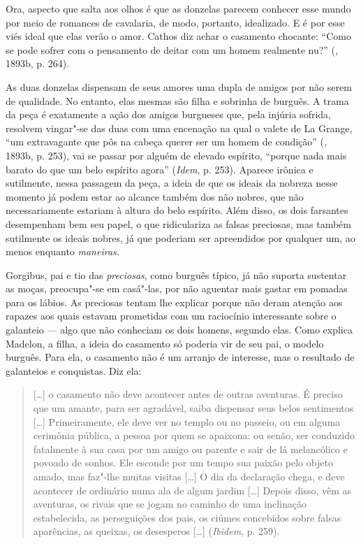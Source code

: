 Ora, aspecto que salta aos olhos é que as donzelas parecem conhecer esse
mundo por meio de romances de cavalaria, de modo, portanto, idealizado.
E é por esse viés ideal que elas verão o amor. Cathos diz achar o
casamento chocante: ``Como se pode sofrer com o pensamento de deitar com
um homem realmente nu?'' (, 1893b, p. 264).

As duas donzelas dispensam de seus amores uma dupla de amigos por não
serem de qualidade. No entanto, elas mesmas são filha e sobrinha de
burguês. A trama da peça é exatamente a ação dos amigos burgueses que,
pela injúria sofrida, resolvem vingar"-se das duas com uma encenação na
qual o valete de La Grange, ``um extravagante que pôs na cabeça querer
ser um homem de condição'' (, 1893b, p. 253), vai se passar por
alguém de elevado espírito, ``porque nada mais barato do que um belo
espírito agora'' (\emph{Idem}, p. 253). Aparece irônica e sutilmente,
nessa passagem da peça, a ideia de que os ideais da nobreza nesse
momento já podem estar ao alcance também dos não nobres, que não
necessariamente estariam à altura do belo espírito. Além disso, os dois
farsantes desempenham bem seu papel, o que ridiculariza as falsas
preciosas, mas também sutilmente os ideais nobres, já que poderiam ser
apreendidos por qualquer um, ao menos enquanto \emph{maneiras.}

Gorgibus, pai e tio das \emph{preciosas}, como burguês típico, já não
suporta sustentar as moças, preocupa"-se em casá"-las, por não aguentar
mais gastar em pomadas para os lábios. As preciosas tentam lhe explicar
porque não deram atenção aos rapazes aos quais estavam prometidas com um
raciocínio interessante sobre o galanteio --- algo que não conheciam os
dois homens, segundo elas. Como explica Madelon, a filha, a ideia do
casamento só poderia vir de seu pai, o modelo burguês. Para ela, o
casamento não é um arranjo de interesse, mas o resultado de galanteios e
conquistas. Diz ela:

\begin{quote}
[\ldots{}] o casamento não deve acontecer antes de outras aventuras.
É preciso que um amante, para ser agradável, saiba dispensar seus belos
sentimentos [\ldots{}] Primeiramente, ele deve ver no templo ou no
passeio, ou em alguma cerimônia pública, a pessoa por quem se apaixona:
ou senão, ser conduzido fatalmente à sua casa por um amigo ou parente e
sair de lá melancólico e povoado de sonhos. Ele esconde por um tempo sua
paixão pelo objeto amado, mas faz"-lhe muitas visitas [\ldots{}] O
dia da declaração chega, e deve acontecer de ordinário numa ala de algum
jardim [\ldots{}] Depois disso, vêm as aventuras, os rivais que se
jogam no caminho de uma inclinação estabelecida, as perseguições dos
pais, os ciúmes concebidos sobre falsas aparências, as queixas, os
desesperos [\ldots{}] (\emph{Ibidem}, p. 259).
\end{quote}

